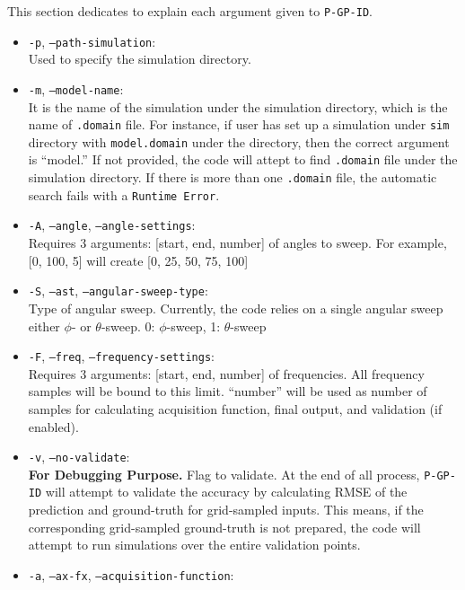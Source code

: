 

\label{SEC:args}

This section dedicates to explain each argument given to \texttt{P-GP-ID}.

\begin{itemize}
  \itemsep 0ex
  \item \texttt{-p}, \texttt{--path-simulation}: 
  \\Used to specify the simulation directory.
  \item \texttt{-m}, \texttt{--model-name}: 
  \\It is the name of the simulation under the simulation directory, which is the name of \texttt{.domain} file. For instance, if user has set up a simulation under \texttt{sim} directory with \texttt{model.domain} under the directory, then the correct argument is ``model.'' If not provided, the code will attept to find \texttt{.domain} file under the simulation directory. If there is more than one \texttt{.domain} file, the automatic search fails with a \texttt{Runtime Error}.
  \item \texttt{-A}, \texttt{--angle}, \texttt{--angle-settings}: 
  \\Requires 3 arguments: [start, end, number] of angles to sweep. For example, [0, 100, 5] will create [0, 25, 50, 75, 100]
  \item \texttt{-S}, \texttt{--ast}, \texttt{--angular-sweep-type}: 
  \\Type of angular sweep. Currently, the code relies on a single angular sweep either $\phi$- or $\theta$-sweep. 0: $\phi$-sweep, 1: $\theta$-sweep
  \item \texttt{-F}, \texttt{--freq}, \texttt{--frequency-settings}: 
  \\Requires 3 arguments: [start, end, number] of frequencies. All frequency samples will be bound to this limit. ``number'' will be used as number of samples for calculating acquisition function, final output, and validation (if enabled).
  \item \texttt{-v}, \texttt{--no-validate}: 
  \\\textbf{For Debugging Purpose.} Flag to validate. At the end of all process, \texttt{P-GP-ID} will attempt to validate the accuracy by calculating RMSE of the prediction and ground-truth for grid-sampled inputs. This means, if the corresponding grid-sampled ground-truth is not prepared, the code will attempt to run simulations over the entire validation points.
  \item \texttt{-a}, \texttt{--ax-fx}, \texttt{--acquisition-function}: 

\end{itemize}
